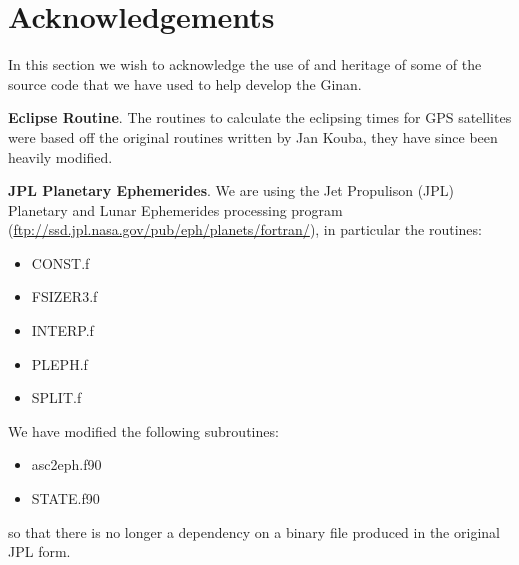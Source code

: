 \chapter{Acknowledgements}
\label{ch:Acknowledgements}

\begin{fullwidth}
    In this section we wish to acknowledge the use of and heritage of some of the source code that we have used to help develop the Ginan.
\end{fullwidth}
\noindent\textbf{Eclipse Routine}. The routines to calculate the eclipsing times for GPS satellites were based off the original routines written by Jan Kouba, they have since been heavily modified.


\noindent\textbf{JPL Planetary Ephemerides}. We are using the Jet Propulison (JPL) Planetary and Lunar Ephemerides processing program (\url{ftp://ssd.jpl.nasa.gov/pub/eph/planets/fortran/}), in particular the routines:

\begin{itemize}
    \item CONST.f
    \item FSIZER3.f
    \item INTERP.f
    \item PLEPH.f
    \item SPLIT.f
\end{itemize}
We have modified the following subroutines:
\begin{itemize}
    \item asc2eph.f90
    \item STATE.f90
\end{itemize}
so that there is no longer a dependency on a binary file produced in the original JPL form.


